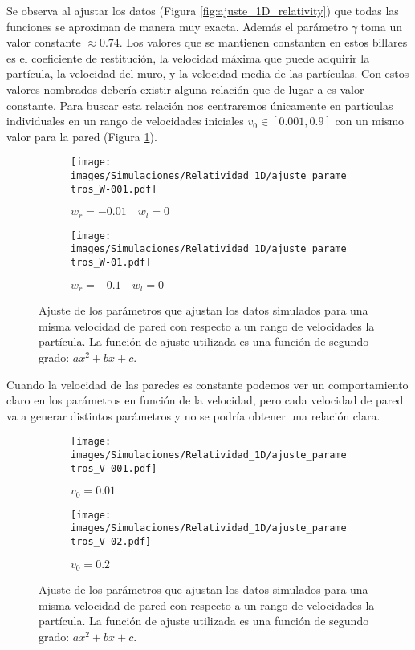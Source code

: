\documentclass[11pt, spanish]{book}
\begin{document}
\vspace{3mm}

Se observa al ajustar los datos (Figura \ref{fig:ajuste_1D_relativity}) que todas las funciones se aproximan de manera muy exacta. Además el parámetro \( \gamma \) toma un valor constante \( \approx 0.74 \). Los valores que se mantienen constanten en estos billares es el coeficiente de restitución, la velocidad máxima que puede adquirir la partícula, la velocidad del muro, y la velocidad media de las partículas. Con estos valores nombrados debería existir alguna relación que de lugar a es valor constante. Para buscar esta relación nos centraremos únicamente en partículas individuales en un rango de velocidades iniciales \( v_0 \in [0.001, 0.9] \) con un mismo valor para la pared (Figura \ref{fig:ajuste_parametros_1D_relativity}). 

\begin{figure}[H]
    \begin{subfigure}[b]{0.5\textwidth}
        \centering
        \texttt{[image: images/Simulaciones/Relatividad\_1D/ajuste\_parametros\_W-001.pdf]}
        \caption{$w_r = -0.01 \quad w_l = 0$}
    \end{subfigure}
    \hfill
    \begin{subfigure}[b]{0.5\textwidth}
        \centering
        \texttt{[image: images/Simulaciones/Relatividad\_1D/ajuste\_parametros\_W-01.pdf]}
        \caption{$w_r = -0.1 \quad w_l = 0$}
    \end{subfigure}
    \caption{Ajuste de los parámetros que ajustan los datos simulados para una misma velocidad de pared con respecto a un rango de velocidades la partícula. La función de ajuste utilizada es una función de segundo grado: \( ax^2 + bx + c \).}
    \label{fig:ajuste_parametros_1D_relativity}
\end{figure}

Cuando la velocidad de las paredes es constante podemos ver un comportamiento claro en los parámetros en función de la velocidad, pero cada velocidad de pared va a generar distintos parámetros y no se podría obtener una relación clara.

\vspace{3mm}

\begin{figure}[H]
    \begin{subfigure}[b]{0.5\textwidth}
        \centering
        \texttt{[image: images/Simulaciones/Relatividad\_1D/ajuste\_parametros\_V-001.pdf]}
        \caption{$v_0 = 0.01$}
    \end{subfigure}
    \hfill
    \begin{subfigure}[b]{0.5\textwidth}
        \centering
        \texttt{[image: images/Simulaciones/Relatividad\_1D/ajuste\_parametros\_V-02.pdf]}
        \caption{$v_0 = 0.2$}
    \end{subfigure}
    \caption{Ajuste de los parámetros que ajustan los datos simulados para una misma velocidad de pared con respecto a un rango de velocidades la partícula. La función de ajuste utilizada es una función de segundo grado: \( ax^2 + bx + c \).}
    \label{fig:ajuste_parametros_1D_relativity_Vcte}
\end{figure}
\end{document}
